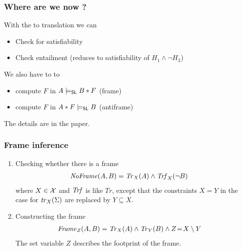 \documentclass{beamer}
\begin{document}
\begin{frame}
  \frametitle{Where are we now ?}
  With the \JoshLogic to \LRJQ translation we can
  \begin{itemize}
  \item Check for satisfiability
  \item Check entailment (reduces to satisfiability of $H_1 \land \neg H_2$)
  \end{itemize}

  \vspace{3ex}

  We also have \LRJQ to \JoshLogic to
  \begin{itemize}
  \item compute $F$ in $A \tightentails B*F$ (frame)
  \item compute $F$ in $A*F \tightentails B$ (antiframe)
  \end{itemize}
  The details are in the paper.
  
\end{frame}

\iffalse
\begin{frame}
  \frametitle{Frame inference}
\begin{enumerate}
\item Checking whether there is a frame
\begin{align*}
\mathit{NoFrame}(A,B) & = \trfull{A}{X} \land \ftrfull_X(\neg B)
\end{align*}
where $X \in \vars$ and $\ftrfull$ is like $\mathit{Tr}$, except that the constraints $X=Y$ in the case for $\tr_X(\Sigma)$ are replaced by $Y \subseteq X$.\\[3ex]
  
\item Constructing the frame
\begin{align*}
\mathit{Frame}_Z(A,B) & = \trfull{A}{X} \land \trfull{B}{Y} \land Z\!=\!X \setminus Y  
\end{align*}
The set variable $Z$ describes the footprint of the frame.
\end{enumerate}

\end{frame}
\end{document}

